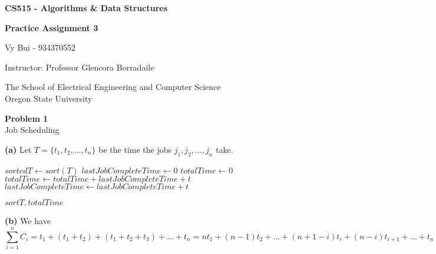 \documentclass[12pt,article]{article}
\newcommand\projnumber{3}
\newenvironment{problem}[2][Problem]
    { \begin{mdframed}[backgroundcolor=gray!20] \textbf{#1 #2} \\}
    {  \end{mdframed}}
\begin{document}
\begin{titlepage}
    \begin{center}
        \vspace*{4cm}

        \textbf{\Large CS515 - Algorithms \& Data Structures}

        \vspace{0.5cm}
 
        \textbf{\Large Practice Assignment \projnumber}
 
        \vspace{1cm}

        Vy Bui - 934370552

        \vspace{2cm}

        Instructor: Professor Glencora Borradaile
        \vfill
             
        \vspace{0.8cm}
      
             
        The School of Electrical Engineering and Computer Science\\
        Oregon State University\\
             
    \end{center}
\end{titlepage}

\begin{problem}{1} 
Job Scheduling
\end{problem}

\textbf{(a)}
Let $T = \{t_1, t_2, ..., t_n\}$ be the time the jobs $j_1, j_2, ..., j_n$ take.

\begin{algorithm}
\caption{$A(T)$}\label{alg:q2}
\begin{algorithmic}
    \State $sortedT \gets sort(T)$
    \State $lastJobCompleteTime \gets 0$
    \State $totalTime \gets 0$
        \State $totalTime \gets totalTime + lastJobCompleteTime + t$
        \State $lastJobCompleteTime \gets lastJobCompleteTime + t$
    \EndFor

    \Return $sortT, totalTime$
\end{algorithmic}
\end{algorithm}

\textbf{(b)}
We have 
$$\sum_{i=1}^{n} C_i = t_1 + (t_1 + t_2) + (t_1 + t_2 + t_3) + ... + t_n 
= nt_1 + (n-1)t_2 + ... + (n+1-i)t_i + (n-i)t_{i+1} + ... + t_n$$
\end{document}
